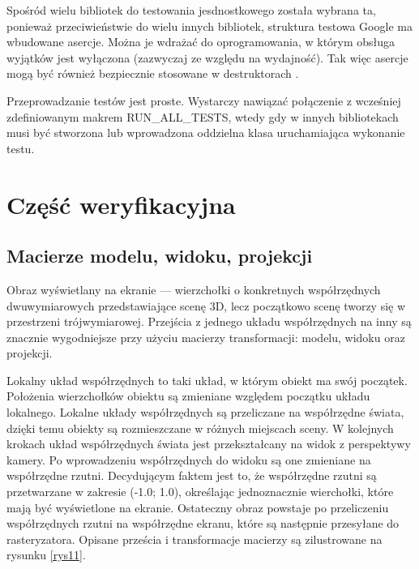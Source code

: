 Spośród wielu bibliotek do testowania jesdnostkowego została wybrana ta, ponieważ przeciwieństwie do wielu innych bibliotek, struktura testowa Google ma wbudowane asercje. Można je wdrażać do oprogramowania, w którym obsługa wyjątków jest wyłączona (zazwyczaj ze względu na wydajność). Tak więc asercje mogą być również bezpiecznie stosowane w destruktorach \cite{ibmGoogle}.

Przeprowadzanie testów jest proste. Wystarczy nawiązać połączenie z wcześniej zdefiniowanym makrem RUN\_ALL\_TESTS, wtedy gdy w innych bibliotekach musi być stworzona lub wprowadzona oddzielna klasa uruchamiająca wykonanie testu. 

\newpage
\section{Część weryfikacyjna}
\subsection{Macierze modelu, widoku, projekcji}
Obraz wyświetlany na ekranie --- wierzchołki o konkretnych współrzędnych dwuwymiarowych przedstawiające scenę 3D, lecz początkowo scenę tworzy się w przestrzeni trójwymiarowej. Przejścia z jednego układu współrzędnych na inny są znacznie wygodniejsze przy użyciu macierzy transformacji: modelu, widoku oraz projekcji. 

Lokalny układ współrzędnych to taki układ, w którym obiekt ma swój początek. Położenia wierzchołków obiektu są zmieniane względem początku układu lokalnego. Lokalne układy współrzędnych są przeliczane na współrzędne świata, dzięki temu obiekty są rozmieszczane w różnych miejscach sceny. W kolejnych krokach układ współrzędnych świata jest przekształcany na widok z perspektywy kamery. Po wprowadzeniu współrzędnych do widoku są one zmieniane na współrzędne rzutni. Decydującym faktem jest to, że współrzędne rzutni są przetwarzane w zakresie (-1.0; 1.0), określając jednoznacznie wierchołki, które mają być wyświetlone na ekranie. Ostateczny obraz powstaje po przeliczeniu współrzędnych rzutni na współrzędne ekranu, które są następnie przesyłane do rasteryzatora. Opisane prześcia i transformacje macierzy są zilustrowane na rysunku \ref{rys11}.

